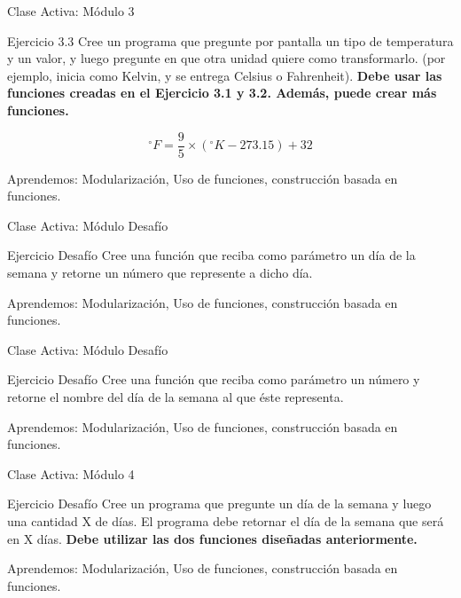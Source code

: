 \documentclass{beamer}
\begin{document}
\begin{frame}[fragile]{Clase Activa: Módulo 3}
\begin{exampleblock}{Ejercicio 3.3}
Cree un programa que pregunte por pantalla un tipo de temperatura y un valor, y luego pregunte en que otra unidad quiere como transformarlo. (por ejemplo, inicia como Kelvin, y se entrega Celsius o Fahrenheit). \textbf{Debe usar las funciones creadas en el Ejercicio 3.1 y 3.2. Además, puede crear más funciones.}

$$ {^\circ}F = \frac{9}{5} \times ({^\circ}K - 273.15) + 32 $$
\end{exampleblock}

{\tiny Aprendemos: Modularización, Uso de funciones, construcción basada en funciones.}
\end{frame}



\begin{frame}[fragile]{Clase Activa: Módulo Desafío}
\begin{exampleblock}{Ejercicio Desafío}
Cree una función que reciba como parámetro un día de la semana y retorne un número que represente a dicho día. 
\end{exampleblock}
{\tiny Aprendemos: Modularización, Uso de funciones, construcción basada en funciones.}
\end{frame}

\begin{frame}[fragile]{Clase Activa: Módulo Desafío}
\begin{exampleblock}{Ejercicio Desafío}
Cree una función que reciba como parámetro un número y retorne el nombre del día de la semana al que éste representa. 
\end{exampleblock}
{\tiny Aprendemos: Modularización, Uso de funciones, construcción basada en funciones.}
\end{frame}

\begin{frame}[fragile]{Clase Activa: Módulo 4}
\begin{exampleblock}{Ejercicio Desafío}
Cree un programa que pregunte un día de la semana y luego una cantidad X de días. El programa debe retornar el día de la semana que será en X días. \textbf{Debe utilizar las dos funciones diseñadas anteriormente.}
\end{exampleblock}

{\tiny Aprendemos: Modularización, Uso de funciones, construcción basada en funciones.}
\end{frame}
\end{document}
